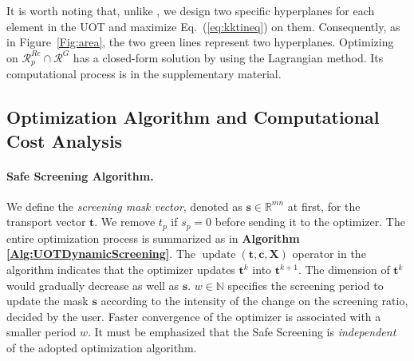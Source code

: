 \documentclass[11pt]{article}
\newcommand{\mat}[1]{\mathbf{#1}}
\renewcommand{\vec}[1]{\bm{#1}}
\begin{document}
It is worth noting that, unlike \cite{7469344}, we design two specific hyperplanes for each element in the UOT and maximize Eq.~(\ref{eq:kktineq}) on them. Consequently, as in Figure~\ref{Fig:area}, the two green lines represent two hyperplanes. Optimizing on $\mathcal{R}^{Re}_{p} \cap \mathcal{R}^{G}$ has a closed-form solution by using the Lagrangian method. Its computational process is in the supplementary material.


\subsection{Optimization Algorithm and Computational Cost Analysis}

\paragraph{Safe Screening Algorithm.} We define the {\it screening mask vector}, denoted as $\vec{s} \in \mathbb{R}^{mn}$ at first, for the transport vector $\vec{t}$. We remove $t_p$ if $s_p = 0$ before sending it to the optimizer. The entire optimization process is summarized as in {\bf Algorithm \ref{Alg:UOTDynamicScreening}}. The $\operatorname{update}(\vec{t},\vec c, \mat X)$ operator in the algorithm indicates that the optimizer updates $\vec{t}^k$ into $\vec{t}^{k+1}$. The dimension of $\vec t^{k}$ would gradually decrease as well as $\vec s$. $w \in \mathbb{N}$ specifies the screening period to update the mask $\vec s$ according to the intensity of the change on the screening ratio, decided by the user. Faster convergence of the optimizer is associated with a smaller period $w$. It must be emphasized that the Safe Screening is {\it independent} of the adopted optimization algorithm.
\end{document}
